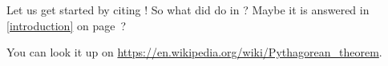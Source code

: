 Let us get started by citing \cite{BeckKKF13}!
So what did \citeauthor{BeckKKF13} do in \citeyear{BeckKKF13}?
Maybe it is answered in \cref{introduction} on page~\pageref{introduction}?

You can look it up on \url{https://en.wikipedia.org/wiki/Pythagorean_theorem}.

